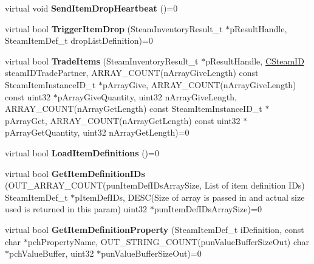 \begin{DoxyCompactItemize}
\item 
\mbox{\label{class_i_steam_inventory_aa10315154a5f1e44468dadd2c30b392e}} 
virtual void {\bfseries Send\+Item\+Drop\+Heartbeat} ()=0
\item 
\mbox{\label{class_i_steam_inventory_a65c5ebcab08c5955cfc561de40819eaa}} 
virtual bool {\bfseries Trigger\+Item\+Drop} (Steam\+Inventory\+Result\+\_\+t $\ast$p\+Result\+Handle, Steam\+Item\+Def\+\_\+t drop\+List\+Definition)=0
\item 
\mbox{\label{class_i_steam_inventory_af2a4c2333150d56f310b7710b7c15bc6}} 
virtual bool {\bfseries Trade\+Items} (Steam\+Inventory\+Result\+\_\+t $\ast$p\+Result\+Handle, \hyperlink{class_c_steam_i_d}{C\+Steam\+ID} steam\+I\+D\+Trade\+Partner, A\+R\+R\+A\+Y\+\_\+\+C\+O\+U\+NT(n\+Array\+Give\+Length) const Steam\+Item\+Instance\+I\+D\+\_\+t $\ast$p\+Array\+Give, A\+R\+R\+A\+Y\+\_\+\+C\+O\+U\+NT(n\+Array\+Give\+Length) const uint32 $\ast$p\+Array\+Give\+Quantity, uint32 n\+Array\+Give\+Length, A\+R\+R\+A\+Y\+\_\+\+C\+O\+U\+NT(n\+Array\+Get\+Length) const Steam\+Item\+Instance\+I\+D\+\_\+t $\ast$p\+Array\+Get, A\+R\+R\+A\+Y\+\_\+\+C\+O\+U\+NT(n\+Array\+Get\+Length) const uint32 $\ast$p\+Array\+Get\+Quantity, uint32 n\+Array\+Get\+Length)=0
\item 
\mbox{\label{class_i_steam_inventory_a44c3026d0d474f98bcd27d9fb9996744}} 
virtual bool {\bfseries Load\+Item\+Definitions} ()=0
\item 
\mbox{\label{class_i_steam_inventory_a8bdb71b0614f22096b1cece7c3c326bc}} 
virtual bool {\bfseries Get\+Item\+Definition\+I\+Ds} (O\+U\+T\+\_\+\+A\+R\+R\+A\+Y\+\_\+\+C\+O\+U\+NT(pun\+Item\+Def\+I\+Ds\+Array\+Size, List of item definition I\+Ds) Steam\+Item\+Def\+\_\+t $\ast$p\+Item\+Def\+I\+Ds, D\+E\+SC(Size of array is passed in and actual size used is returned in this param) uint32 $\ast$pun\+Item\+Def\+I\+Ds\+Array\+Size)=0
\item 
\mbox{\label{class_i_steam_inventory_afe262b1238ba71fa3a0119163f021894}} 
virtual bool {\bfseries Get\+Item\+Definition\+Property} (Steam\+Item\+Def\+\_\+t i\+Definition, const char $\ast$pch\+Property\+Name, O\+U\+T\+\_\+\+S\+T\+R\+I\+N\+G\+\_\+\+C\+O\+U\+NT(pun\+Value\+Buffer\+Size\+Out) char $\ast$pch\+Value\+Buffer, uint32 $\ast$pun\+Value\+Buffer\+Size\+Out)=0

\end{DoxyCompactItemize}
